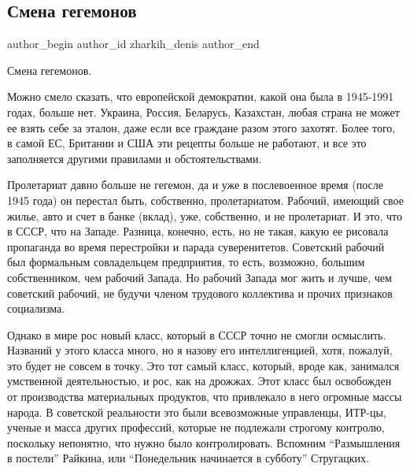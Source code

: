  
 
 
 
 
 
\subsection{Смена гегемонов}
\label{sec:09_01_2022.fb.zharkih_denis.1.smena_gegemonov}
 
\ifcmt
 author_begin
   author_id zharkih_denis
 author_end
\fi

Смена гегемонов.

Можно смело сказать, что европейской демократии, какой она была в 1945-1991
годах, больше нет. Украина, Россия, Беларусь, Казахстан, любая страна не может
ее взять себе за эталон, даже если все граждане разом этого захотят. Более
того, в самой ЕС, Британии и США эти рецепты больше не работают, и все это
заполняется другими правилами и обстоятельствами. 

Пролетариат давно больше не гегемон, да и уже в послевоенное время (после 1945
года) он перестал быть, собственно, пролетариатом. Рабочий, имеющий свое жилье,
авто и счет в банке (вклад), уже, собственно, и не пролетариат. И это, что в
СССР, что на Западе. Разница, конечно, есть, но не такая, какую ее рисовала
пропаганда во время перестройки и парада суверенитетов. Советский рабочий был
формальным совладельцем предприятия, то есть, возможно, большим собственником,
чем рабочий Запада. Но рабочий Запада мог жить и лучше, чем советский рабочий,
не будучи членом трудового коллектива и прочих признаков социализма. 

Однако в мире рос новый класс, который в СССР точно не смогли осмыслить.
Названий у этого класса много, но я назову его интеллигенцией, хотя, пожалуй,
это будет не совсем в точку.  Это тот самый класс, который, вроде как,
занимался умственной деятельностью, и рос, как на дрожжах. Этот класс был
освобожден от производства материальных продуктов, что привлекало в него
огромные массы народа. В советской реальности это были всевозможные управленцы,
ИТР-цы, ученые и масса других профессий, которые не подлежали строгому
контролю, поскольку непонятно, что нужно было контролировать. Вспомним
\enquote{Размышления в постели} Райкина, или \enquote{Понедельник начинается в субботу}
Стругацких. 

